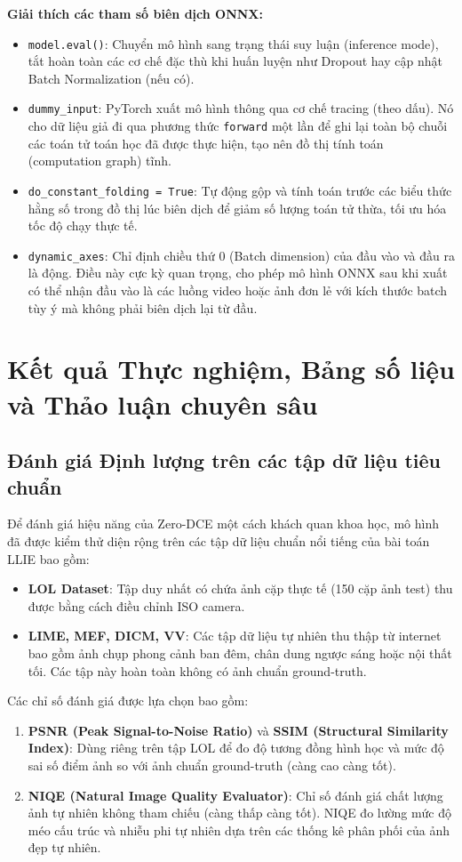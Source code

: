 \documentclass[a4paper]{article}
\begin{document}
\noindent \textbf{Giải thích các tham số biên dịch ONNX:}
\begin{itemize}
    \item \texttt{model.eval()}: Chuyển mô hình sang trạng thái suy luận (inference mode), tắt hoàn toàn các cơ chế đặc thù khi huấn luyện như Dropout hay cập nhật Batch Normalization (nếu có).
    \item \texttt{dummy\_input}: PyTorch xuất mô hình thông qua cơ chế tracing (theo dấu). Nó cho dữ liệu giả đi qua phương thức \texttt{forward} một lần để ghi lại toàn bộ chuỗi các toán tử toán học đã được thực hiện, tạo nên đồ thị tính toán (computation graph) tĩnh.
    \item \texttt{do\_constant\_folding = True}: Tự động gộp và tính toán trước các biểu thức hằng số trong đồ thị lúc biên dịch để giảm số lượng toán tử thừa, tối ưu hóa tốc độ chạy thực tế.
    \item \texttt{dynamic\_axes}: Chỉ định chiều thứ 0 (Batch dimension) của đầu vào và đầu ra là động. Điều này cực kỳ quan trọng, cho phép mô hình ONNX sau khi xuất có thể nhận đầu vào là các luồng video hoặc ảnh đơn lẻ với kích thước batch tùy ý mà không phải biên dịch lại từ đầu.
\end{itemize}

\clearpage

\section{Kết quả Thực nghiệm, Bảng số liệu và Thảo luận chuyên sâu}

\subsection{Đánh giá Định lượng trên các tập dữ liệu tiêu chuẩn}
Để đánh giá hiệu năng của Zero-DCE một cách khách quan khoa học, mô hình đã được kiểm thử diện rộng trên các tập dữ liệu chuẩn nổi tiếng của bài toán LLIE bao gồm:
\begin{itemize}
    \item \textbf{LOL Dataset}: Tập duy nhất có chứa ảnh cặp thực tế (150 cặp ảnh test) thu được bằng cách điều chỉnh ISO camera.
    \item \textbf{LIME, MEF, DICM, VV}: Các tập dữ liệu tự nhiên thu thập từ internet bao gồm ảnh chụp phong cảnh ban đêm, chân dung ngược sáng hoặc nội thất tối. Các tập này hoàn toàn không có ảnh chuẩn ground-truth.
\end{itemize}

Các chỉ số đánh giá được lựa chọn bao gồm:
\begin{enumerate}
    \item \textbf{PSNR (Peak Signal-to-Noise Ratio)} và \textbf{SSIM (Structural Similarity Index)}: Dùng riêng trên tập LOL để đo độ tương đồng hình học và mức độ sai số điểm ảnh so với ảnh chuẩn ground-truth (càng cao càng tốt).
    \item \textbf{NIQE (Natural Image Quality Evaluator)}: Chỉ số đánh giá chất lượng ảnh tự nhiên không tham chiếu (càng thấp càng tốt). NIQE đo lường mức độ méo cấu trúc và nhiễu phi tự nhiên dựa trên các thống kê phân phối của ảnh đẹp tự nhiên.
\end{enumerate}
\end{document}
